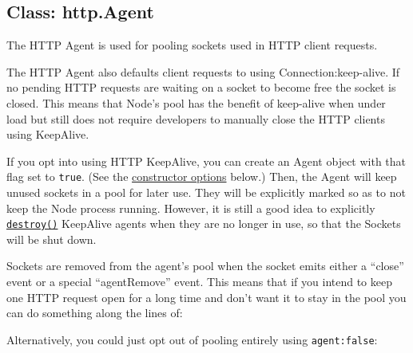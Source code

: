 \subsection{Class: http.Agent}\label{class-http.agent}

The HTTP Agent is used for pooling sockets used in HTTP client requests.

The HTTP Agent also defaults client requests to using
Connection:keep-alive. If no pending HTTP requests are waiting on a
socket to become free the socket is closed. This means that Node's pool
has the benefit of keep-alive when under load but still does not require
developers to manually close the HTTP clients using KeepAlive.

If you opt into using HTTP KeepAlive, you can create an Agent object
with that flag set to \texttt{true}. (See the
\hyperref[httpux5fnewux5fagentux5foptions]{constructor options} below.)
Then, the Agent will keep unused sockets in a pool for later use. They
will be explicitly marked so as to not keep the Node process running.
However, it is still a good idea to explicitly
\hyperref[httpux5fagentux5fdestroy]{\texttt{destroy()}} KeepAlive agents
when they are no longer in use, so that the Sockets will be shut down.

Sockets are removed from the agent's pool when the socket emits either a
``close'' event or a special ``agentRemove'' event. This means that if
you intend to keep one HTTP request open for a long time and don't want
it to stay in the pool you can do something along the lines of:

\begin{Shaded}
\begin{Highlighting}[]
\NormalTok{(}\NormalTok{, } 
  \NormalTok{(}\NormalTok{);}
\NormalTok{\});}
\end{Highlighting}
\end{Shaded}

Alternatively, you could just opt out of pooling entirely using
\texttt{agent:false}:

\begin{Shaded}
\begin{Highlighting}[]
\NormalTok{(\{}
  \NormalTok{: }\NormalTok{,}
  \NormalTok{: }\NormalTok{,}
  \NormalTok{: }\NormalTok{,}
  \NormalTok{: }  
\NormalTok{\}, } 
\NormalTok{\})}
\end{Highlighting}
\end{Shaded}

